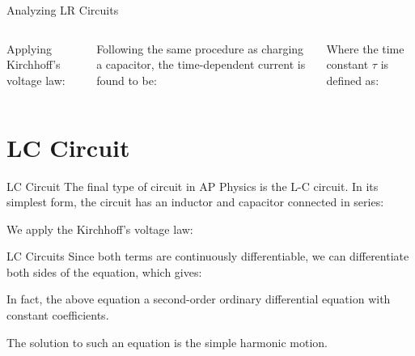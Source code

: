 \documentclass[12pt,aspectratio=169]{beamer}
\begin{document}
\begin{frame}{Analyzing LR Circuits}
  \begin{columns}

    Applying Kirchhoff's voltage law:


    Following the same procedure as charging a capacitor, the time-dependent
    current is found to be:


    Where the time constant $\tau$ is defined as:
    
  \end{columns}
\end{frame}



\section{LC Circuit}

\begin{frame}{LC Circuit}
  The final type of circuit in AP Physics is the L-C circuit. In its simplest
  form, the circuit has an inductor and capacitor connected in series:
  \begin{center}
  \end{center}
  We apply the Kirchhoff's voltage law:
  
\end{frame}



\begin{frame}{LC Circuits}
  Since both terms are continuously differentiable, we can differentiate both
  sides of the equation, which gives:


  In fact, the above equation a second-order ordinary differential equation
  with constant coefficients.


  The solution to such an equation is the simple harmonic motion.

\end{frame}
\end{document}
